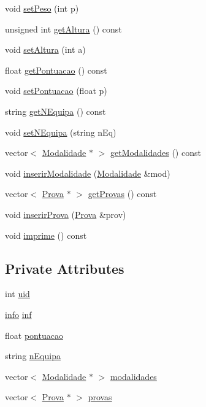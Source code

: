\begin{DoxyCompactItemize}
\item 
void \hyperlink{class_atleta_af9ef31c49a31a7a4514f6c676caad01d}{set\+Peso} (int p)
\item 
unsigned int \hyperlink{class_atleta_a8ad4b5fcf8bb3cf4bdf6f428728c5ebc}{get\+Altura} () const 
\item 
void \hyperlink{class_atleta_a559420bb8aa5e5ee881ffe284f24a7df}{set\+Altura} (int a)
\item 
float \hyperlink{class_atleta_afc8a2e69817d94c7dad61a66928d98f6}{get\+Pontuacao} () const 
\item 
void \hyperlink{class_atleta_a4bacfffad058d3437083a4a53fd2169c}{set\+Pontuacao} (float p)
\item 
string \hyperlink{class_atleta_aea91ba91e81827418585318e081a7e82}{get\+N\+Equipa} () const 
\item 
void \hyperlink{class_atleta_ae6f75c0295ae244256caab4af4345fae}{set\+N\+Equipa} (string n\+Eq)
\item 
vector$<$ \hyperlink{class_modalidade}{Modalidade} $\ast$ $>$ \hyperlink{class_atleta_a4e4a08618d388c914705e4552bee3f00}{get\+Modalidades} () const 
\item 
void \hyperlink{class_atleta_ad0d0e9f9f781ddfce8b628dcd57d2a6e}{inserir\+Modalidade} (\hyperlink{class_modalidade}{Modalidade} \&mod)
\item 
vector$<$ \hyperlink{class_prova}{Prova} $\ast$ $>$ \hyperlink{class_atleta_a4d87755e5d458d4a2c5d53015669ad21}{get\+Provas} () const 
\item 
void \hyperlink{class_atleta_aba485676bf190d09e19044660b2af329}{inserir\+Prova} (\hyperlink{class_prova}{Prova} \&prov)
\item 
void \hyperlink{class_atleta_abfac40f3ca907a1b89152794a5a29f96}{imprime} () const 
\end{DoxyCompactItemize}
\subsection*{Private Attributes}
\begin{DoxyCompactItemize}
\item 
int \hyperlink{class_atleta_ae471f8c198a8a84275afa23598e03d44}{uid}
\item 
\hyperlink{structinfo}{info} \hyperlink{class_atleta_a1492a3f905e1915797e128b7e0be8017}{inf}
\item 
float \hyperlink{class_atleta_ac7fb325ccbe94fe9494d54da4c08b045}{pontuacao}
\item 
string \hyperlink{class_atleta_af159b255beef6455905f0c871355b1ee}{n\+Equipa}
\item 
vector$<$ \hyperlink{class_modalidade}{Modalidade} $\ast$ $>$ \hyperlink{class_atleta_a0f04a0dcd8724d10617db7b1e2482e1c}{modalidades}
\item 
vector$<$ \hyperlink{class_prova}{Prova} $\ast$ $>$ \hyperlink{class_atleta_aefafb252cadc4ab80434bb697674e865}{provas}
\end{DoxyCompactItemize}
